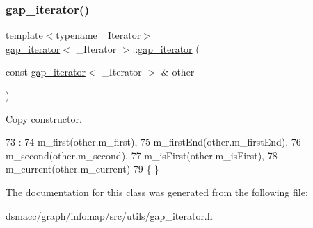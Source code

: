 \subsubsection{\texorpdfstring{gap\+\_\+iterator()}{gap\_iterator()}}
{\footnotesize\ttfamily template$<$typename \+\_\+\+Iterator$>$ \\
\mbox{\hyperlink{classgap__iterator}{gap\+\_\+iterator}}$<$ \+\_\+\+Iterator $>$\+::\mbox{\hyperlink{classgap__iterator}{gap\+\_\+iterator}} (\begin{DoxyParamCaption}\item[{const \mbox{\hyperlink{classgap__iterator}{gap\+\_\+iterator}}$<$ \+\_\+\+Iterator $>$ \&}]{other }\end{DoxyParamCaption})\hspace{0.3cm}{\ttfamily [inline]}}

Copy constructor. 
\begin{DoxyCode}
73                                             :
74         m\_first(other.m\_first),
75         m\_firstEnd(other.m\_firstEnd),
76         m\_second(other.m\_second),
77         m\_isFirst(other.m\_isFirst),
78         m\_current(other.m\_current)
79     \{ \}
\end{DoxyCode}


The documentation for this class was generated from the following file\+:\begin{DoxyCompactItemize}
\item 
dsmacc/graph/infomap/src/utils/gap\+\_\+iterator.\+h\end{DoxyCompactItemize}
